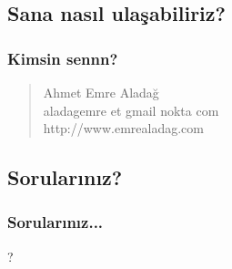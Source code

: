\documentclass{beamer}
\begin{document}
	\subsection{Sana nasıl ulaşabiliriz?}
	\begin{frame}
	 	\frametitle{Kimsin sennn?}
		\begin{quote}
 			Ahmet Emre Aladağ \\ aladagemre et gmail nokta com \\ http://www.emrealadag.com\\
		\end{quote}
	\end{frame}

	\subsection{Sorularınız?}
	\begin{frame}
	 	\frametitle{Sorularınız...}
		\begin{center}
		 ?
		\end{center}
		
	\end{frame}
\end{document}
